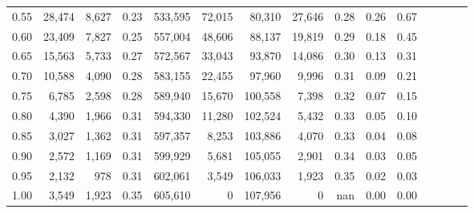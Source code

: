 \begin{tabular}{rrrcrrrrrrrrrrr}
0.55 &  28,474 &   8,627 &                                       0.23 &  533,595 &   72,015 &   80,310 &   27,646 &  0.28 &  0.26 &                         0.67 \\
0.60 &  23,409 &   7,827 &                                       0.25 &  557,004 &   48,606 &   88,137 &   19,819 &  0.29 &  0.18 &                         0.45 \\
0.65 &  15,563 &   5,733 &                                       0.27 &  572,567 &   33,043 &   93,870 &   14,086 &  0.30 &  0.13 &                         0.31 \\
0.70 &  10,588 &   4,090 &                                       0.28 &  583,155 &   22,455 &   97,960 &    9,996 &  0.31 &  0.09 &                         0.21 \\
0.75 &   6,785 &   2,598 &                                       0.28 &  589,940 &   15,670 &  100,558 &    7,398 &  0.32 &  0.07 &                         0.15 \\
0.80 &   4,390 &   1,966 &                                       0.31 &  594,330 &   11,280 &  102,524 &    5,432 &  0.33 &  0.05 &                         0.10 \\
0.85 &   3,027 &   1,362 &                                       0.31 &  597,357 &    8,253 &  103,886 &    4,070 &  0.33 &  0.04 &                         0.08 \\
0.90 &   2,572 &   1,169 &                                       0.31 &  599,929 &    5,681 &  105,055 &    2,901 &  0.34 &  0.03 &                         0.05 \\
0.95 &   2,132 &     978 &                                       0.31 &  602,061 &    3,549 &  106,033 &    1,923 &  0.35 &  0.02 &                         0.03 \\
1.00 &   3,549 &   1,923 &                                       0.35 &  605,610 &        0 &  107,956 &        0 &   nan &  0.00 &                         0.00 \\
\bottomrule
\end{tabular}
